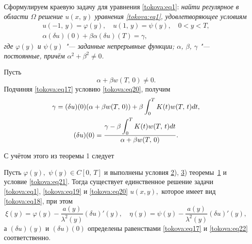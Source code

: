 \smallskip

 Сформулируем краевую задачу для уравнения
\eqref{tokova:eq1}: {\sl найти регулярное в области $\Omega $ решение $u(x,\,y)$ уравнения \eqref{tokova:eq1}, удовлетворяющее условиям
\begin{gather}
\label{tokova:eq19}
u(-1,\,y)=\varphi(y), \quad u(1,\,y)=\psi(y), \quad 0<y<T, \\
\label{tokova:eq20}
\alpha(\delta u)(0)+\beta\alpha(\delta u)(T)=\gamma,
\end{gather}
где $\varphi(y)$ и $\psi(y)$ "--- заданные непрерывные функции; $\alpha$, $\beta$, $\gamma$ "--- постоянные, причём $\alpha^2+\beta^2\neq
0$.}

Пусть
\begin{equation}
\label{tokova:eq21}
\alpha+\beta w(T,\,0)\neq 0.
\end{equation}
Подчиняя \eqref{tokova:eq17} условию  \eqref{tokova:eq20}, получим
\begin{gather}
\notag
\gamma=(\delta u)(0)(\alpha+\beta w(T,\,0))+\beta \int _0^T K(t)w(T,\,t)dt,\\
\label{tokova:eq22}
(\delta u)(0)=\frac{\displaystyle\gamma-\beta\int _0^T
K(t)w(T,\,t)dt}{\alpha+\beta w(T,\,0)}.
\end{gather}

С учётом этого из теоремы 1 следует

\smallskip
\begin{theorem}[2]Пусть $\varphi(y),$ $\psi(y)\in C[0,\,T]$ и выполнены условия 
{\rm \hyperlink{tok:2}{2}), \hyperlink{tok:3}{3})} теоремы~{\rm \hyperlink{tok:th:1}{1}} и условие {\rm \eqref{tokova:eq21}.} Тогда существует единственное решение задачи {\rm \eqref{tokova:eq1}, \eqref{tokova:eq19}} и \eqref{tokova:eq20} $u(x,y),$ которое имеет вид {\rm \eqref{tokova:eq18},} 
при этом
\[
\xi(y)=\varphi(y)-\frac{a(y)}{\lambda^2(y)}(\delta u)'(y), \quad \eta(y)=\psi(y)-\frac{a(y)}{\lambda^2(y)}(\delta u)'(y),
\]
а $(\delta u)(y)$ и $(\delta u)(0)$ определены равенствами \eqref{tokova:eq17} и {\rm \eqref{tokova:eq22}} соответственно\rm.
\end{theorem}

\pagebreak

